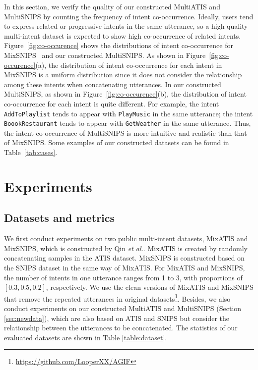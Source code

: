\documentclass[11pt]{article}
\begin{document}
In this section, we verify the quality of our constructed MultiATIS and MultiSNIPS by counting the frequency of intent co-occurrence. Ideally, users tend to express related or progressive intents in the same utterance, so a high-quality multi-intent dataset is expected to show high co-occurrence of related intents. Figure~\ref{fig:co-occurence} shows the distributions of intent co-occurrence for MixSNIPS~\cite{DBLP:conf/emnlp/QinXCL20} and our constructed MultiSNIPS. As shown in Figure~\ref{fig:co-occurence}(a), the distribution of intent co-occurrence for each intent in MixSNIPS is a uniform distribution since it does not consider the relationship among these intents when concatenating utterances. In our constructed MultiSNIPS, as shown in Figure~\ref{fig:co-occurence}(b), the distribution of intent co-occurrence for each intent is quite different. For example, the intent \texttt{AddToPlaylist} tends to appear with \texttt{PlayMusic} in the same utterance; the intent \texttt{BoookRestaurant} tends to appear with \texttt{GetWeather} in the same utterance. Thus, the intent co-occurrence of MultiSNIPS is more intuitive and realistic than that of MixSNIPS. Some examples of our constructed datasets can be found in Table~\ref{tab:cases}.

 
\section{Experiments}
\label{sec:exp}
\subsection{Datasets and metrics}
We first conduct experiments on two public multi-intent datasets, MixATIS and MixSNIPS, which is constructed by Qin \textit{et al.}\cite{DBLP:conf/emnlp/QinXCL20}. MixATIS is created by randomly concatenating samples in the ATIS dataset\cite{DBLP:conf/naacl/HemphillGD90}. MixSNIPS is constructed based on the SNIPS dataset\cite{Coucke2018SNIPS} in the same way of MixATIS. For MixATIS and MixSNIPS, the number of intents in one utterance ranges from 1 to 3, with proportions of $[0.3, 0.5, 0.2]$, respectively. We use the clean versions of MixATIS and MixSNIPS that remove the repeated utterances in original datasets\footnote{\url{https://github.com/LooperXX/AGIF}}. Besides, we also conduct experiments on our constructed MultiATIS and MultiSNIPS (Section \ref{sec:newdata}), which are also based on ATIS and SNIPS but consider the relationship between the utterances to be concatenated. The statistics of our evaluated datasets are shown in Table \ref{table:dataset}.
\end{document}
